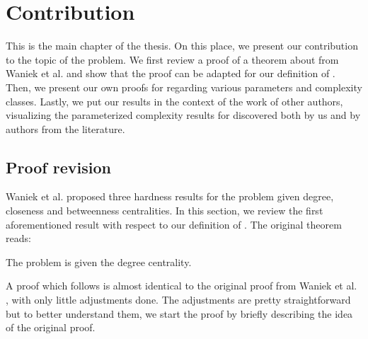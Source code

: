 \chapter{Contribution}\label{chapter:contribution}

This is the main chapter of the thesis.
On this place, we present our contribution to the topic of the \HL problem.
We first review a proof of a theorem about \HLdeg from Waniek et al. \cite{Waniek2017} and show
that the proof can be adapted for our definition of \HL.
Then, we present our own proofs for \HLdeg regarding various parameters and complexity classes.
Lastly, we put our results in the context of the work of other authors,
visualizing the parameterized complexity results for \HLdeg discovered both by us and by authors
from the literature.


\section{Proof revision}\label{section:proofRevision}

Waniek et al. \cite{Waniek2021full} proposed three hardness results for the \HL problem given degree, closeness and betweenness
centralities. In this section, we review the first aforementioned result with respect to our definition of \HLshort.
The original theorem reads:

\begin{theorem}
    The \HL problem is \NPc given the degree centrality.
\end{theorem}

A proof which follows is almost identical to the original proof from Waniek et al. \cite{Waniek2021full},
with only little adjustments done.
The adjustments are pretty straightforward but to better understand them,
we start the proof by briefly describing the idea of the original proof.

